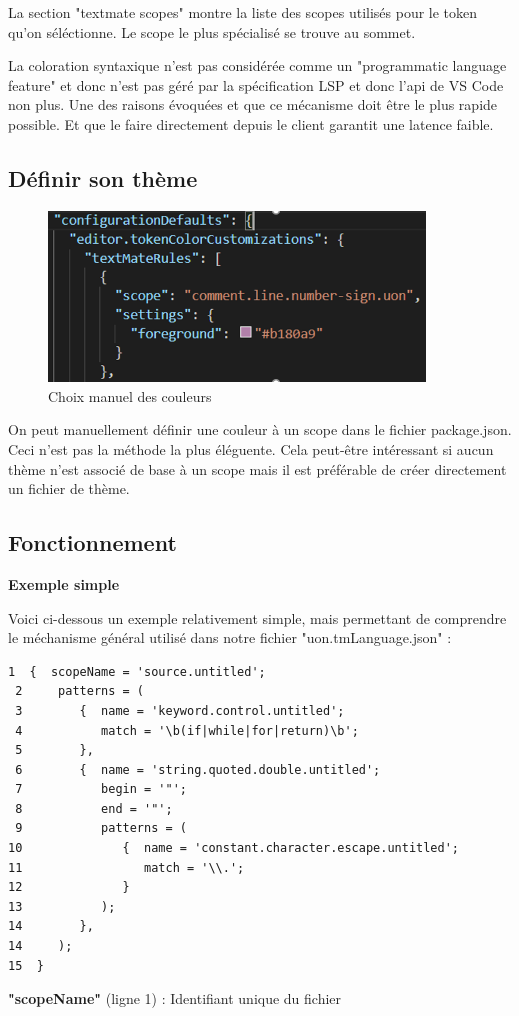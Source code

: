 \documentclass[
    iict, %
    il, %
]{heig-tb}
\begin{document}
La section "textmate scopes" montre la liste des scopes utilisés pour le token qu'on séléctionne. Le scope le plus spécialisé se trouve au sommet.

La coloration syntaxique n'est pas considérée comme un "programmatic language feature" et donc n'est pas géré par la spécification LSP et donc l'api de VS Code non plus. 
Une des raisons évoquées et que ce mécanisme doit être le plus rapide possible. Et que le faire directement depuis le client garantit une latence faible.

\subsection{Définir son thème}
\begin{figure}[!h]
    \begin{center}
        \includegraphics[width=10cm]{assets/figures/manual-settings-color.png}
    \end{center}
    \caption[Choix manuel des couleurs]{\label{manual-settings-color} Choix manuel des couleurs}
\end{figure}

On peut manuellement définir une couleur à un scope dans le fichier package.json. Ceci n'est pas la méthode la plus éléguente.
Cela peut-être intéressant si aucun thème n'est associé de base à un scope mais il est préférable de créer directement un fichier de thème.


\subsection{Fonctionnement}
\textbf{Exemple simple}

Voici ci-dessous un exemple relativement simple, mais permettant de comprendre le méchanisme général utilisé dans notre fichier "uon.tmLanguage.json" :
\begin{lstlisting}[frame=single, caption={Textmate grammar},label={Textmate grammar}]
 1  {  scopeName = 'source.untitled';
 2     patterns = (
 3        {  name = 'keyword.control.untitled';
 4           match = '\b(if|while|for|return)\b';
 5        },
 6        {  name = 'string.quoted.double.untitled';
 7           begin = '"';
 8           end = '"';
 9           patterns = (
10              {  name = 'constant.character.escape.untitled';
11                 match = '\\.';
12              }
13           );
14        },
14     );
15  }
\end{lstlisting}
\textbf{"scopeName"} (ligne 1) : Identifiant unique du fichier
\end{document}
